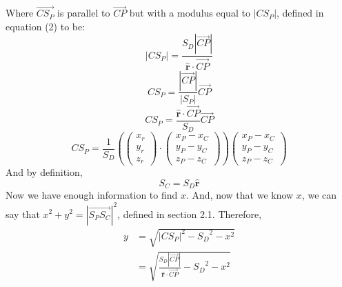 \documentclass{article}
\begin{document}
	
	Where $\overrightarrow{C S_P}$ is parallel to $\overrightarrow{CP}$ but with a modulus equal to $\left|CS_P\right|$, defined in equation (2) to be:
	$$\left|C S_P\right| = \frac{S_D \left|\overrightarrow{CP}\right| }{ \hat{\mathbf{r}} \cdot \overrightarrow{CP}}$$
 	$$C S_P = \frac{\left|\overrightarrow{CP}\right|}{\left|S_P\right|} \overrightarrow{CP}$$
	$$C S_P = \frac{\hat{\mathbf{r}} \cdot \overrightarrow{CP}}{S_D} \overrightarrow{CP} $$
	$$C S_P = \frac{1}{S_D} \left( \begin{pmatrix}x_r\\y_r\\z_r\end{pmatrix} \cdot \begin{pmatrix}x_P-x_C\\y_P - y_C\\z_P - z_C 
	\end{pmatrix} \right) \begin{pmatrix}x_P-x_C\\y_P - y_C\\z_P - z_C \end{pmatrix}
	$$
	And by definition,
	$$ S_C = S_D \hat{\mathbf{r}}$$
	Now we have enough information to find $x$. And, now that we know $x$, we can say that $x^2 + y^2 = \left|\overrightarrow{S_P 
	S_C}\right|^2$, defined in section 2.1. Therefore,
	\begin{align*}
		y & = \sqrt{ \left|C S_P\right|^2 - {S_D} ^2 - x^2}\\
		& = \sqrt{\frac{S_D \left|\overrightarrow{CP}\right| }{ \hat{\mathbf{r}} \cdot \overrightarrow{CP}} - {S_D}^2 - x^2}
	\end{align*}
			

	
\end{document}
